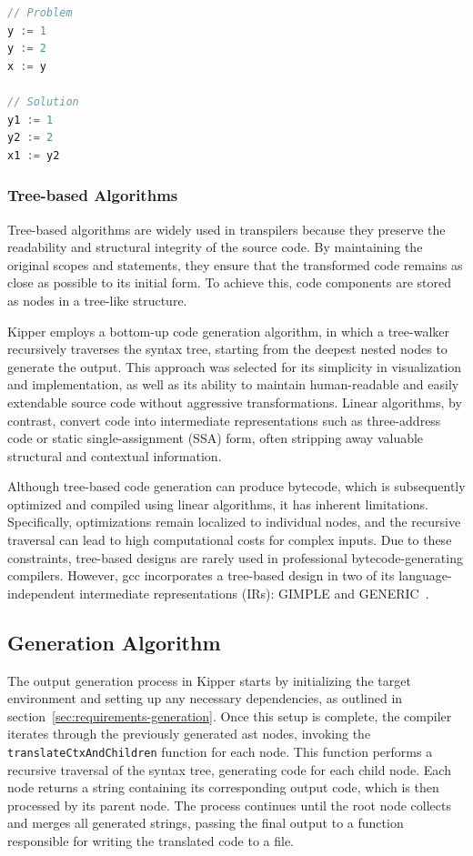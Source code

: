 \begin{lstlisting}[language=TypeScript,caption=Static single-assignment form,label=lst:implementation:staticsingleassignmentform]
// Problem
y := 1
y := 2
x := y

// Solution
y1 := 1
y2 := 2
x1 := y2
\end{lstlisting}

\subsubsection{Tree-based Algorithms}

Tree-based algorithms are widely used in \gls{transpiler}s because they preserve the readability and structural integrity of the source code. By maintaining the original scopes and statements, they ensure that the transformed code remains as close as possible to its initial form. To achieve this, code components are stored as nodes in a tree-like structure.

Kipper employs a bottom-up code generation algorithm, in which a tree-walker recursively traverses the syntax tree, starting from the deepest nested nodes to generate the output. This approach was selected for its simplicity in visualization and implementation, as well as its ability to maintain human-readable and easily extendable source code without aggressive transformations. Linear algorithms, by contrast, convert code into intermediate representations such as three-address code or static single-assignment (SSA) form, often stripping away valuable structural and contextual information.

Although tree-based code generation can produce bytecode, which is subsequently optimized and compiled using linear algorithms, it has inherent limitations. Specifically, optimizations remain localized to individual nodes, and the recursive traversal can lead to high computational costs for complex inputs. Due to these constraints, tree-based designs are rarely used in professional bytecode-generating compilers. However, \acrshort{gcc} incorporates a tree-based design in two of its language-independent intermediate representations (IRs): GIMPLE and GENERIC~\cite{gcc:gimpletuples}.

\subsection{Generation Algorithm}

The output generation process in Kipper starts by initializing the target environment and setting up any necessary dependencies, as outlined in section~\ref{sec:requirements-generation}. Once this setup is complete, the compiler iterates through the previously generated \acrshort{ast} nodes, invoking the \lstinline|translateCtxAndChildren| function for each node. This function performs a recursive traversal of the syntax tree, generating code for each child node. Each node returns a string containing its corresponding output code, which is then processed by its parent node. The process continues until the root node collects and merges all generated strings, passing the final output to a function responsible for writing the translated code to a file.

